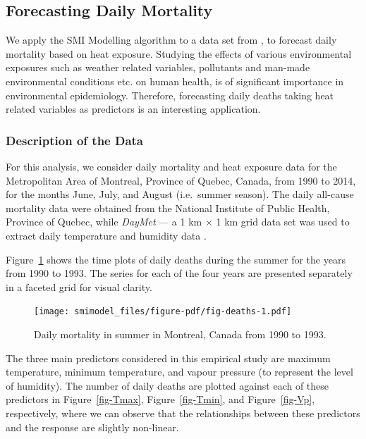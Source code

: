 \documentclass[11pt,a4paper,]{article}
\begin{document}
\hypertarget{sec-mortality}{%
\subsection{Forecasting Daily Mortality}\label{sec-mortality}}

We apply the SMI Modelling algorithm to a data set from
\textcite{Masselot2022}, to forecast daily mortality based on heat
exposure. Studying the effects of various environmental exposures such
as weather related variables, pollutants and man-made environmental
conditions etc. on human health, is of significant importance in
environmental epidemiology. Therefore, forecasting daily deaths taking
heat related variables as predictors is an interesting application.

\hypertarget{description-of-the-data}{%
\subsubsection{Description of the Data}\label{description-of-the-data}}

For this analysis, we consider daily mortality and heat exposure data
for the Metropolitan Area of Montreal, Province of Quebec, Canada, from
1990 to 2014, for the months June, July, and August (i.e.~summer
season). The daily all-cause mortality data were obtained from the
National Institute of Public Health, Province of Quebec, while
\emph{DayMet} --- a 1 km × 1 km grid data set \autocite{Thornton2021}
was used to extract daily temperature and humidity data
\autocite{Masselot2022}.

Figure~\ref{fig-deaths} shows the time plots of daily deaths during the
summer for the years from 1990 to 1993. The series for each of the four
years are presented separately in a faceted grid for visual clarity.

\begin{figure}

{\centering \texttt{[image: smimodel\_files/figure-pdf/fig-deaths-1.pdf]}

}

\caption{\label{fig-deaths}Daily mortality in summer in Montreal, Canada
from 1990 to 1993.}

\end{figure}

The three main predictors considered in this empirical study are maximum
temperature, minimum temperature, and vapour pressure (to represent the
level of humidity). The number of daily deaths are plotted against each
of these predictors in Figure~\ref{fig-Tmax}, Figure~\ref{fig-Tmin}, and
Figure~\ref{fig-Vp}, respectively, where we can observe that the
relationships between these predictors and the response are slightly
non-linear.
\end{document}
